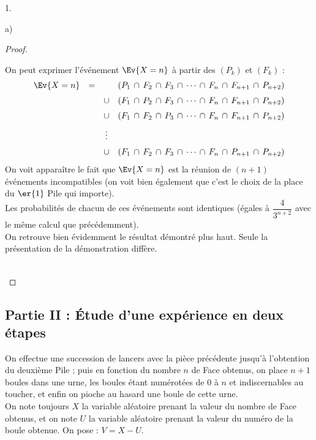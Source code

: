 \documentclass[11pt]{article}%
\begin{document}
\begin{noliste}{1.}
\begin{noliste}{a)}
\begin{proof}
      \begin{remark}
        On peut exprimer l'événement $\Ev{X=n}$ à partir des $(P_k)$ 
        et $(F_k)$ :
        \[
          \begin{array}{rccl}
            \Ev{X=n} & = & & (P_1 \, \cap \, F_2 \, \cap \, F_3 \, \cap 
            \, \cdots \, \cap \, F_n \, \cap \, F_{n+1} \, \cap \,
            P_{n+2})
            \\[.2cm]
            & & \cup & (F_1 \, \cap \, P_2 \, \cap \, F_3 \, \cap 
            \, \cdots \, \cap \, F_n \, \cap \, F_{n+1} \, \cap \,
            P_{n+2})
            \\[.2cm]
            & & \cup & (F_1 \, \cap \, F_2 \, \cap \, P_3 \, \cap 
            \, \cdots \, \cap \, F_n \, \cap \, F_{n+1} \, \cap \,
            P_{n+2})
            \\[.2cm]
            & & \vdots &
            \\[.2cm]
            & & \cup & (F_1 \, \cap \, F_2 \, \cap \, F_3 \, \cap 
            \, \cdots \, \cap \, F_n \, \cap \, P_{n+1} \, \cap \,
            P_{n+2})
          \end{array}
        \]
        On voit apparaître le fait que $\Ev{X=n}$ est la réunion de 
	$(n+1)$
        événements incompatibles (on voit bien également que c'est le
        choix de la place du $\er{1}$ Pile qui importe).\\
        Les probabilités de chacun de ces événements sont 
        identiques (égales à $\dfrac{4}{3^{n+2}}$ avec le même 
        calcul que précédemment).\\
        On retrouve bien évidemment le résultat démontré plus haut.
        Seule la présentation de la démonstration diffère.
      \end{remark}~\\[-1.4cm]
    \end{proof}
  \end{noliste}
\end{noliste}



\subsection*{Partie II : Étude d'une expérience en deux étapes}

\noindent
On effectue une succession de lancers avec la pièce précédente jusqu'à 
l'obtention du deuxième Pile ; puis en fonction du nombre $n$ de Face 
obtenus, on place $n+1$ boules dans une urne, les boules étant 
numérotées de $0$ à $n$ et indiscernables au toucher, et enfin on 
pioche au hasard une boule de cette urne.\\[.1cm]
On note toujours $X$ la variable aléatoire prenant la valeur du nombre 
de Face obtenus, et on note $U$ la variable aléatoire prenant la valeur 
du numéro de la boule obtenue. On pose : $V=X-U$.
\end{document}
